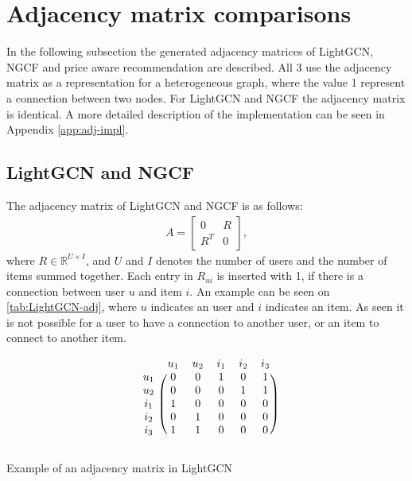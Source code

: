 \section{Adjacency matrix comparisons}
In the following subsection the generated adjacency matrices of LightGCN, NGCF and price aware recommendation are described.
All 3 use the adjacency matrix as a representation for a heterogeneous graph, where the value 1 represent a connection between two nodes.
For LightGCN and NGCF the adjacency matrix is identical.
A more detailed description of the implementation can be seen in Appendix \ref{app:adj-impl}.

\subsection{LightGCN and NGCF}
The adjacency matrix of LightGCN and NGCF is as follows:
\begin{gather}
    A =
    \begin{bmatrix}
        0   & R \\
        R^T & 0
    \end{bmatrix},
\end{gather}
where $R \in \mathbb{R}^{U \times I}$, and $U$ and $I$ denotes the number of users and the number of items summed together.
Each entry in $R_{ui}$ is inserted with 1, if there is a connection between user $u$ and item $i$.
An example can be seen on \autoref{tab:LightGCN-adj}, where $u$ indicates an user and $i$ indicates an item.
As seen it is not possible for a user to have a connection to another user, or an item to connect to another item.
\begin{table}

    \[
        \begin{blockarray}{cccccc}
            & u_1 & u_2 & i_1 & i_2 & i_3 \\
            \begin{block}{c(ccccc)}
                u_1 & 0 & 0 & 1 & 0 & 1   \\
                u_2 & 0 & 0 & 0 & 1 & 1   \\
                i_1 & 1 & 0 & 0 & 0 & 0   \\
                i_2 & 0 & 1 & 0 & 0 & 0   \\
                i_3 & 1 & 1 & 0 & 0 & 0   \\
            \end{block}
        \end{blockarray}
    \]
    \caption{Example of an adjacency matrix in LightGCN}
    \label{tab:LightGCN-adj}
\end{table}

